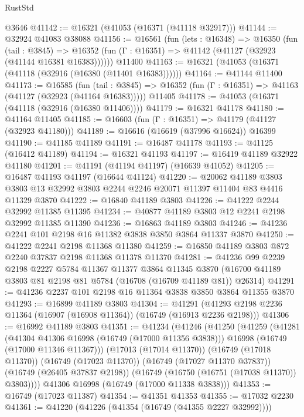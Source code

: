 \begin{lexlean}{RustStd}
\begin{coremodule}
    @3646
@41142 := @16321 (@41053 (@16371 (@41118 @32917)))
@41144 := @32924 @41083 @38088
@41156 := @16561
    (fun (lets : @16348) =>
    @16350
      (fun (tail : @3845) =>
      @16352 (fun (Γ : @16351) => @41142 (@41127 (@32923 (@41144 @16381 @16383))))))
    @11400
@41163 := @16321 (@41053 (@16371 (@41118 (@32916 (@16380 (@11401 @16383))))))
@41164 := @41144 @11400
@41173 := @16585
    (fun (tail : @3845) => @16352 (fun (Γ : @16351) => @41163 (@41127 (@32923 (@41164 @16383)))))
    @11405
@41178 := @41053 (@16371 (@41118 (@32916 (@16380 @11406))))
@41179 := @16321 @41178
@41180 := @41164 @11405
@41185 := @16603 (fun (Γ : @16351) => @41179 (@41127 (@32923 @41180)))
@41189 := @16616 (@16619 (@37996 @16624)) @16399
@41190 := @41185 @41189
@41191 := @16487 @41178
@41193 := @41125 (@16412 @41189)
@41194 := @16321 @41193
@41197 := @16419 @41189 @32922 @41180
@41201 := @41191 (@41194 @41197) (@16639 @41052)
@41205 := @16487 @41193 @41197 (@16644 @41124)
@41220 := @20062
    @41189
    @3803
    @3803
    @13
    @32992
    @3803
    @2244
    @2246
    @20071
    @11397
    @11404
    @83
    @4416
    @11329
    @3870
@41222 := @16840 @41189 @3803
@41226 := @41222 @2244 @32992 @11385 @11395
@41234 := @40877 @41189 @3803 @12 @2241 @2198 @32992 @11385 @11390
@41236 := @16863 @41189 @3803
@41246 := @41236 @2241 @101 @2198 @16 @11382 @3838 @3850 @3864 @11337 @3870
@41250 := @41222 @2241 @2198 @11368 @11380
@41259 := @16850 @41189 @3803 @872 @2240 @37837 @2198 @11368 @11378 @11370
@41281 := @41236
    @99
    @2239
    @2198
    @2227
    @5784
    @11367
    @11377
    @3864
    @11345
    @3870
    (@16700 @41189 @3803 @81 @2198 @81 @5784 (@16708 (@16709 @41189 @81)) @26314)
@41291 := @41236 @2237 @101 @2198 @16 @11364 @3838 @3850 @3864 @11355 @3870
@41293 := @16899 @41189 @3803
@41304 := @41291 (@41293 @2198 @2236 @11364 (@16907 (@16908 @11364)) (@16749 (@16913 @2236 @2198)))
@41306 := @16992 @41189 @3803
@41351 := @41234
    (@41246
      (@41250
        (@41259
          (@41281
            (@41304 @41306 @16998 (@16749 (@17000 @11356 @3838)))
            @16998
            (@16749 (@17000 @11346 @11367)))
          (@17013 (@17014 @11370))
          (@16749 (@17018 @11370))
          (@16749 (@17023 @11370))
          (@16749 (@17027 @11370 @37837))
          (@16749 (@26405 @37837 @2198))
          (@16749 (@16750 (@16751 (@17038 @11370)) @3803))))
      @41306
      @16998
      (@16749 (@17000 @11338 @3838)))
@41353 := @16749 (@17023 @11387)
@41354 := @41351 @41353
@41355 := @17032 @2230
@41361 := @41220 (@41226 (@41354 (@16749 (@41355 @2227 @32992))))

\end{coremodule}
\end{lexlean}
